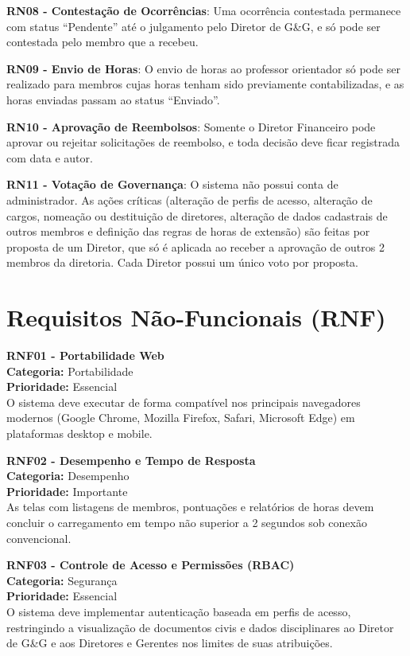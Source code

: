 \textbf{RN08 - Contestação de Ocorrências}: Uma ocorrência contestada permanece com status ``Pendente'' até o julgamento pelo Diretor de G\&G, e só pode ser contestada pelo membro que a recebeu.

\textbf{RN09 - Envio de Horas}: O envio de horas ao professor orientador só pode ser realizado para membros cujas horas tenham sido previamente contabilizadas, e as horas enviadas passam ao status ``Enviado''.

\textbf{RN10 - Aprovação de Reembolsos}: Somente o Diretor Financeiro pode aprovar ou rejeitar solicitações de reembolso, e toda decisão deve ficar registrada com data e autor.

\textbf{RN11 - Votação de Governança}: O sistema não possui conta de administrador. As ações críticas (alteração de perfis de acesso, alteração de cargos, nomeação ou destituição de diretores, alteração de dados cadastrais de outros membros e definição das regras de horas de extensão) são feitas por proposta de um Diretor, que só é aplicada ao receber a aprovação de outros 2 membros da diretoria. Cada Diretor possui um único voto por proposta.

\section{Requisitos Não-Funcionais (RNF)}

\textbf{RNF01 - Portabilidade Web}\\
\textbf{Categoria:} Portabilidade\\
\textbf{Prioridade:} Essencial\\
O sistema deve executar de forma compatível nos principais navegadores modernos (Google Chrome, Mozilla Firefox, Safari, Microsoft Edge) em plataformas desktop e mobile.

\textbf{RNF02 - Desempenho e Tempo de Resposta}\\
\textbf{Categoria:} Desempenho\\
\textbf{Prioridade:} Importante\\
As telas com listagens de membros, pontuações e relatórios de horas devem concluir o carregamento em tempo não superior a 2 segundos sob conexão convencional.

\textbf{RNF03 - Controle de Acesso e Permissões (RBAC)}\\
\textbf{Categoria:} Segurança\\
\textbf{Prioridade:} Essencial\\
O sistema deve implementar autenticação baseada em perfis de acesso, restringindo a visualização de documentos civis e dados disciplinares ao Diretor de G\&G e aos Diretores e Gerentes nos limites de suas atribuições.

